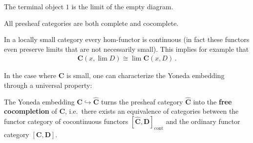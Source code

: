     \begin{example}
        The terminal object $1$ is the limit of the empty diagram.
    \end{example}

    \begin{example}\label{cat:complete_presheaf_category}
        All presheaf categories are both complete and cocomplete.
    \end{example}

    \begin{example}
        In a locally small category every hom-functor is continuous (in fact these functors even preserve limits that are not necessarily small). This implies for example that
        \begin{gather}
            \mathbf{C}(x,\lim D)\cong\lim\mathbf{C}(x,D)\,.
        \end{gather}
    \end{example}

    In the case where $\mathbf{C}$ is small, one can characterize the Yoneda embedding through a universal property:
    \begin{uproperty}\label{cat:free_cocompletion}
        The Yoneda embedding $\mathbf{C}\hookrightarrow\widehat{\mathbf{C}}$ turns the presheaf category $\widehat{\mathbf{C}}$ into the \textbf{free cocompletion} of $\mathbf{C}$, i.e.~there exists an equivalence of categories between the functor category of cocontinuous functors $[\widehat{\mathbf{C}},\mathbf{D}]_\mathrm{cont}$ and the ordinary functor category $[\mathbf{C},\mathbf{D}]$.
    \end{uproperty}

